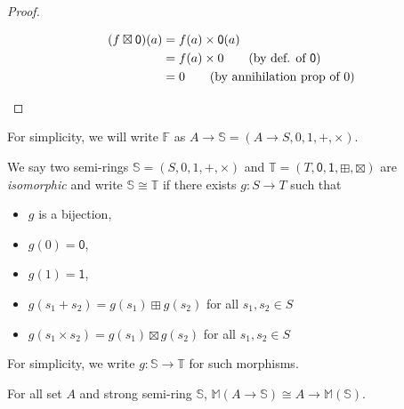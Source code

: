 \documentclass[runningheads]{llncs}
\begin{document}
\begin{proof}
\begin{description}
			\begin{align*}
				(f \boxtimes \mathsf{0} )(a) & = f(a) \times \mathsf{0} (a)                     \\
				                             & = f(a) \times 0 \tag{by def. of \(\mathsf{0} \)} \\
				                             & = 0 \tag{by annihilation prop of \(0\)}
			\end{align*}

	\end{description}
\end{proof}

For simplicity, we will write \(\mathbb{F} \) as \(A \to \mathbb{S} = (A \to S, 0, 1, +, \times )\).

\begin{definition}
	\label{def:iso}
	We say two semi-rings \(\mathbb{S} =(S, 0, 1, +, \times )\) and \(\mathbb{T} = (T, \mathsf{0} , \mathsf{1} , \boxplus , \boxtimes )\) are \emph{isomorphic} and write \(\mathbb{S} \cong \mathbb{T} \) if there exists \(g: S \to T\) such that

	\begin{itemize}
		\item \(g\) is a bijection,
		\item \(g(0) = \mathsf{0} \),
		\item \(g(1) = \mathsf{1} \),
		\item \(g(s_1 + s_2) = g(s_1) \boxplus g(s_2)\) for all \(s_1, s_2 \in S\)
		\item \(g(s_1 \times s_2) = g(s_1) \boxtimes g(s_2)\) for all \(s_1, s_2 \in S\)
	\end{itemize}
	For simplicity, we write \(g: \mathbb{S} \to \mathbb{T} \) for such morphisms.
\end{definition}

\begin{lemma}
	\label{lem:semi-ring-iso}
	For all set \(A\) and strong semi-ring \(\mathbb{S} \), \(\mathbb{M} (A \to \mathbb{S} ) \cong A \to \mathbb{M} (\mathbb{S} )\).
\end{lemma}
\end{document}
